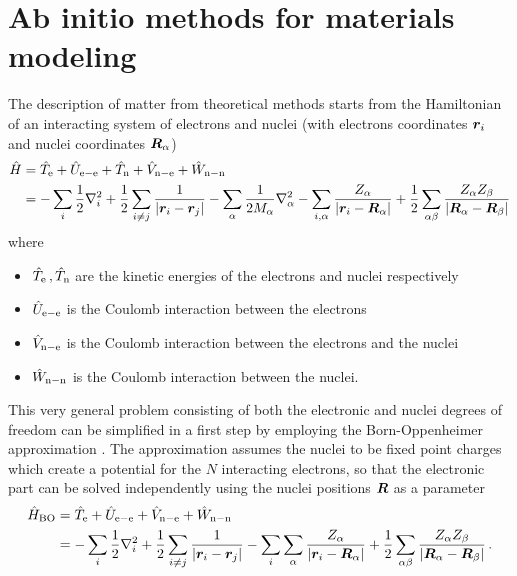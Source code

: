 \documentclass[main.tex]{subfiles}
\begin{document}
\chapter{Ab initio methods for materials modeling}\label{chap:ab-initio-modeling}


The description of matter from theoretical methods starts from the Hamiltonian of an interacting system of electrons and nuclei (with electrons coordinates \(\vb*{r}_i\) and nuclei coordinates \(\vb*{R}_{\alpha}\))
\begin{align}
    \hat{H} &= \hat{T}_{\mathrm{e}} + \hat{U}_{\mathrm{e-e}} + \hat{T}_{\mathrm{n}} + \hat{V}_{\mathrm{n-e}} + \hat{W}_{\mathrm{n-n}} \\
    &= - \sum_i \frac{1}{2} \nabla^2_i 
    + \frac{1}{2} \sum_{i \neq j} \frac{1}{\vert \vb*{r}_i - \vb*{r}_j \vert} 
    - \sum_{\alpha} \frac{1}{2 M_{\alpha}} \nabla^2_{\alpha}
    - \sum_{i, \alpha} \frac{Z_{\alpha}}{\vert \vb*{r}_i - \vb*{R}_{\alpha} \vert} 
    + \frac{1}{2} \sum_{\alpha \beta} \frac{Z_{\alpha} Z_{\beta}}{\vert \vb*{R}_{\alpha} - \vb*{R}_{\beta} \vert}
\end{align}
where
\begin{itemize}
    \item \(\hat{T}_{\mathrm{e}}\,, \hat{T}_{\mathrm{n}}\) are the kinetic energies of the electrons and nuclei respectively
    \item \(\hat{U}_{\mathrm{e-e}}\) is the Coulomb interaction between the electrons
    \item \(\hat{V}_{\mathrm{n-e}}\) is the Coulomb interaction between the electrons and the nuclei
    \item \(\hat{W}_{\mathrm{n-n}}\) is the Coulomb interaction between the nuclei.
\end{itemize}
This very general problem consisting of both the electronic and nuclei degrees of freedom can be simplified in a first step by employing the Born-Oppenheimer approximation \cite{born_zur_1927}.
The approximation assumes the nuclei to be fixed point charges which create a potential for the \(N\) interacting electrons, so that the electronic part can be solved independently using the nuclei positions \(\vb*{R}\) as a parameter
\begin{align}
    \hat{H}_{\mathrm{BO}} &= \hat{T}_{\mathrm{e}} + \hat{U}_{\mathrm{e-e}} + \hat{V}_{\mathrm{n-e}} + \hat{W}_{\mathrm{n-n}} \\
    &= -\sum_i \frac{1}{2} \nabla^2_i 
    + \frac{1}{2} \sum_{i \neq j} \frac{1}{\vert \vb*{r}_i - \vb*{r}_j \vert} 
    - \sum_i \sum_{\alpha} \frac{Z_{\alpha}}{\vert \vb*{r}_i 
    - \vb*{R}_{\alpha} \vert} 
    + \frac{1}{2} \sum_{\alpha \beta} \frac{Z_{\alpha} Z_{\beta}}{\vert \vb*{R}_{\alpha} - \vb*{R}_{\beta} \vert}\,. \label{eq:bo_hamiltonian}
\end{align}
\end{document}
